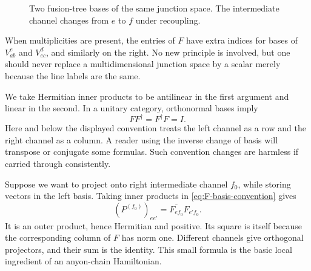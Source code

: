 \begin{figure}[htbp]
\centering
{}
\caption{Two fusion-tree bases of the same junction space.  The
intermediate channel changes from $e$ to $f$ under recoupling.}
\label{fig:fusion-trees}
\end{figure}

When multiplicities are present, the entries of $F$ have extra indices
for bases of $V_{ab}^{e}$ and $V_{ec}^{d}$, and similarly on the right.
No new principle is involved, but one should never replace a
multidimensional junction space by a scalar merely because the line
labels are the same.

We take Hermitian inner products to be antilinear in the first
argument and linear in the second. In a unitary category,
orthonormal bases imply
\[
 F F^\dagger=F^\dagger F=I.
\]
Here and below the displayed convention treats the left channel as a
row and the right channel as a column.  A reader using the inverse
change of basis will transpose or conjugate some formulas.  Such
convention changes are harmless if carried through consistently.

\begin{example}
Suppose we want to project onto right intermediate channel $f_0$,
while storing vectors in the left basis.  Taking inner products in
\eqref{eq:F-basis-convention} gives
\begin{equation}
 (P^{(f_0)})_{ee'}
 =\overline{F_{e f_0}}F_{e'f_0}.
 \label{eq:recoupling-projector}
\end{equation}
It is an outer product, hence Hermitian and positive.  Its square is
itself because the corresponding column of $F$ has norm one.  Different
channels give orthogonal projectors, and their sum is the identity.
This small formula is the basic local ingredient of an anyon-chain
Hamiltonian.
\end{example}

